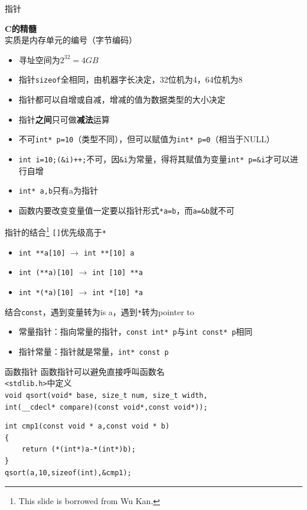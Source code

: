 \documentclass[UTF8]{ctexbeamer}
\begin{document}
\begin{frame}[fragile]{指针}
\begin{center}
\Large \textbf{C的精髓}\\
实质是内存单元的编号（字节编码）
\end{center}
\pause
\begin{itemize}[<+->]
	\item 寻址空间为$2^{32}=4GB$
	\item 指针\verb'sizeof'全相同，由机器字长决定，32位机为4，64位机为8
	\item 指针都可以自增或自减，增减的值为数据类型的大小决定
	\item 指针\textbf{之间}只可做\textbf{减法}运算
	\item 不可\verb'int* p=10'（类型不同），但可以赋值为\verb'int* p=0'（相当于NULL）
	\item \verb'int i=10;(&i)++;'不可，因\verb'&i'为常量，得将其赋值为变量\verb'int* p=&i'才可以进行自增
	\item \verb'int* a,b'只有a为指针
	\item 函数内要改变变量值一定要以指针形式\verb'*a=b'，而\verb'a=&b'就不可
\end{itemize}
\end{frame}


\begin{frame}[fragile]{指针的结合\protect\footnote{This slide is borrowed from Wu Kan.}}
\verb'[]'优先级高于\verb'*'
\begin{itemize}
	\item \verb'int **a[10]' $\to$ \verb'int **[10] a'
	\item \verb'int (**a)[10]' $\to$ \verb'int [10] **a'
	\item \verb'int *(*a)[10]' $\to$ \verb'int *[10] *a'
\end{itemize}
\pause
结合\verb'const'，遇到变量转为is a，遇到\verb'*'转为pointer to
\begin{itemize}
	\item 常量指针：指向常量的指针，\verb'const int* p'与\verb'int const* p'相同
	\item 指针常量：指针就是常量，\verb'int* const p'
\end{itemize}
\end{frame}

\begin{frame}[fragile]{函数指针}
函数指针可以避免直接呼叫函数名\\
\verb'<stdlib.h>'中定义\\
\verb'void qsort(void* base, size_t num, size_t width,'\\
\verb'int(__cdecl* compare)(const void*,const void*));'
\begin{lstlisting}
int cmp1(const void * a,const void * b)  
{  
    return (*(int*)a-*(int*)b); 
} 
qsort(a,10,sizeof(int),&cmp1);
\end{lstlisting}
\end{frame}
\end{document}
